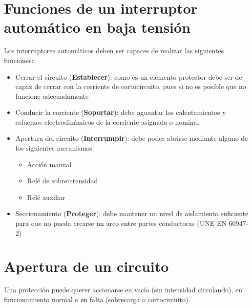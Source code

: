 \section{Funciones de un interruptor automático en baja tensión}
Los interruptores automáticos deben ser capaces de realizar las siguientes funciones:
\begin{itemize}
	\item Cerrar el circuito (\textbf{Establecer}): como es un elemento protector debe ser de capaz de cerrar con la corriente de cortocircuito, pues si no es posible que no funcione adecuadamente
	\item Conducir la corriente (\textbf{Soportar}): debe aguantar los calentamientos y esfuerzos electrodinámicos de la corriente asignada o nominal
	\item Apertura del circuito (\textbf{Interrumpir}): debe poder abrirse mediante alguno de los siguientes mecanismos:
	\begin{itemize}
		\item Acción manual
		\item Relé de sobreintensidad
		\item Relé auxiliar
	\end{itemize}
	\item Seccionamiento (\textbf{Proteger}): debe mantener un nivel de aislamiento suficiente para que no pueda crearse un arco entre partes conductoras (UNE EN 60947-2)
\end{itemize}
\section{Apertura de un circuito}
Una protección puede querer accionarse en vacío (sin intensidad circulando), en funcionamiento normal o en falta (sobrecarga o cortocircuito). 
\newline

